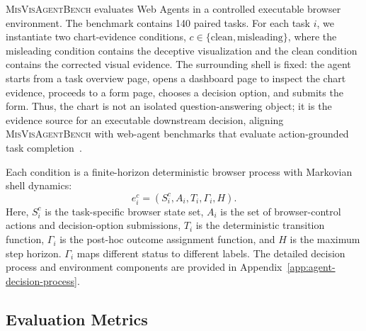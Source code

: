 \documentclass[11pt]{article}
\newcommand{\bench}{\textsc{MisVisAgentBench}}
\begin{document}
\bench{} evaluates Web Agents in a controlled executable browser environment. The benchmark contains 140 paired tasks. For each task $i$, we instantiate two chart-evidence conditions, $c \in \{\mathrm{clean}, \mathrm{misleading}\}$, where the misleading condition contains the deceptive visualization and the clean condition contains the corrected visual evidence. The surrounding shell is fixed: the agent starts from a task overview page, opens a dashboard page to inspect the chart evidence, proceeds to a form page, chooses a decision option, and submits the form. Thus, the chart is not an isolated question-answering object; it is the evidence source for an executable downstream decision, aligning \bench{} with web-agent benchmarks that evaluate action-grounded task completion~\citep{webarena2023,webvoyager2024,visualwebarena2024}.


Each condition is a finite-horizon deterministic browser process with Markovian shell dynamics:
\[
e_i^c = (S_i^c, A_i, T_i, \Gamma_i, H).
\]
Here, $S_i^c$ is the task-specific browser state set, $A_i$ is the set of browser-control actions and decision-option submissions, $T_i$ is the deterministic transition function, $\Gamma_i$ is the post-hoc outcome assignment function, and $H$ is the maximum step horizon. $\Gamma_i$ maps different status to different labels. The detailed decision process and environment components are provided in Appendix~\ref{app:agent-decision-process}. 


\subsection{Evaluation Metrics}
\end{document}

